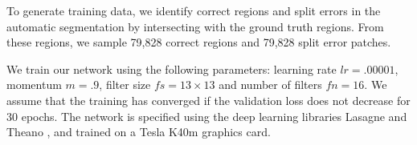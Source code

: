 To generate training data, we identify correct regions and split errors in the automatic segmentation by intersecting with the ground truth regions. From these regions, we sample 79,828 correct regions and 79,828 split error patches.

We train our network using the following parameters: learning rate $lr=.00001$, momentum $m=.9$, filter size $fs=13\times13$ and number of filters $fn=16$. We assume that the training has converged if the validation loss does not decrease for 30 epochs. The network is specified using the deep learning libraries Lasagne and Theano \cite{Bastien-Theano-2012}, and trained on a Tesla K40m graphics card. 






%
